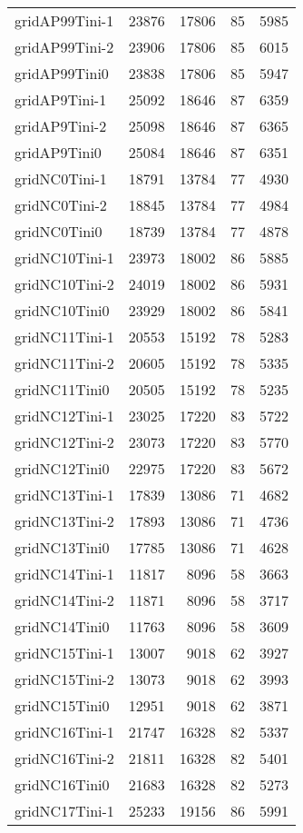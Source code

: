 \begin{tabular}{lrrrr}
gridAP99Tini-1 & 23876 & 17806 & 85 & 5985 \\
gridAP99Tini-2 & 23906 & 17806 & 85 & 6015 \\
gridAP99Tini0 & 23838 & 17806 & 85 & 5947 \\
gridAP9Tini-1 & 25092 & 18646 & 87 & 6359 \\
gridAP9Tini-2 & 25098 & 18646 & 87 & 6365 \\
gridAP9Tini0 & 25084 & 18646 & 87 & 6351 \\
gridNC0Tini-1 & 18791 & 13784 & 77 & 4930 \\
gridNC0Tini-2 & 18845 & 13784 & 77 & 4984 \\
gridNC0Tini0 & 18739 & 13784 & 77 & 4878 \\
gridNC10Tini-1 & 23973 & 18002 & 86 & 5885 \\
gridNC10Tini-2 & 24019 & 18002 & 86 & 5931 \\
gridNC10Tini0 & 23929 & 18002 & 86 & 5841 \\
gridNC11Tini-1 & 20553 & 15192 & 78 & 5283 \\
gridNC11Tini-2 & 20605 & 15192 & 78 & 5335 \\
gridNC11Tini0 & 20505 & 15192 & 78 & 5235 \\
gridNC12Tini-1 & 23025 & 17220 & 83 & 5722 \\
gridNC12Tini-2 & 23073 & 17220 & 83 & 5770 \\
gridNC12Tini0 & 22975 & 17220 & 83 & 5672 \\
gridNC13Tini-1 & 17839 & 13086 & 71 & 4682 \\
gridNC13Tini-2 & 17893 & 13086 & 71 & 4736 \\
gridNC13Tini0 & 17785 & 13086 & 71 & 4628 \\
gridNC14Tini-1 & 11817 & 8096 & 58 & 3663 \\
gridNC14Tini-2 & 11871 & 8096 & 58 & 3717 \\
gridNC14Tini0 & 11763 & 8096 & 58 & 3609 \\
gridNC15Tini-1 & 13007 & 9018 & 62 & 3927 \\
gridNC15Tini-2 & 13073 & 9018 & 62 & 3993 \\
gridNC15Tini0 & 12951 & 9018 & 62 & 3871 \\
gridNC16Tini-1 & 21747 & 16328 & 82 & 5337 \\
gridNC16Tini-2 & 21811 & 16328 & 82 & 5401 \\
gridNC16Tini0 & 21683 & 16328 & 82 & 5273 \\
gridNC17Tini-1 & 25233 & 19156 & 86 & 5991 \\

\end{tabular}
